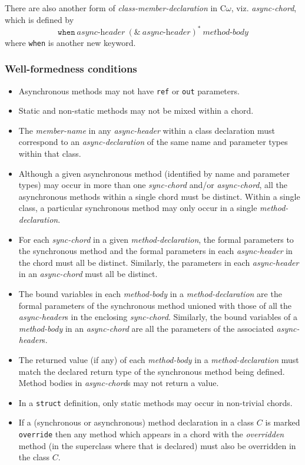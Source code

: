 \documentclass{article}
\newcommand{\comega}{\mbox{C$\omega$}}
\begin{document}
There are also another form of \emph{class-member-declaration} in
\comega, viz. \emph{async-chord}, which is defined by
\[
\texttt{when}\ \textit{async-header}\ (\texttt{\&}\
\textit{async-header})^\ast\ \textit{method-body}
\]
where \texttt{when} is another new keyword.

\subsubsection{Well-formedness conditions}
\begin{itemize}
\item Asynchronous methods may not have \texttt{ref} or \texttt{out}
parameters.
\item Static and non-static methods may not be mixed within a chord.
\item The \emph{member-name} in any \emph{async-header} within a class
declaration must correspond to an \emph{async-declaration} of the same
name and parameter types within that class.
\item Although a given asynchronous method (identified by name and
parameter types) may occur in more than one \emph{sync-chord} and/or
\emph{async-chord}, all the asynchronous methods within a single chord
must be distinct. Within a single class, a particular synchronous
method may only occur in a single \emph{method-declaration}.
\item For each \emph{sync-chord} in a given \emph{method-declaration}, the formal parameters to the
synchronous method and the formal parameters in each
\emph{async-header} in the chord must all be distinct. Similarly, the
parameters in each \emph{async-header} in an \emph{async-chord} must
all be distinct.
\item The bound variables in each \emph{method-body} in a
\emph{method-declaration} are the formal parameters of the synchronous
method unioned with those of all the \emph{async-header}s in the
enclosing \emph{sync-chord}. Similarly, the bound variables of a
\emph{method-body} in an \emph{async-chord} are all the parameters of
the associated \emph{async-header}s.
\item The returned value (if any) of each \emph{method-body} in a
\emph{method-declaration} must match the declared return type of the
synchronous method being defined. Method bodies in \emph{async-chord}s
may not return a value.
\item In a \texttt{struct} definition, only static methods may occur in
non-trivial chords.
\item If a (synchronous or asynchronous) method declaration in a class
$C$ is marked \texttt{override} then any method which appears in a
chord with the \emph{overridden} method (in the superclass where that
is declared) must also be overridden in the class $C$.
\end{itemize}
\end{document}
